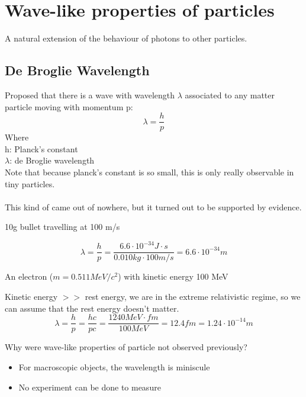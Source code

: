 \documentclass[class=article,crop=false]{standalone}
\begin{document}
\section{Wave-like properties of particles}
A natural extension of the behaviour of photons to other particles.

\subsection{De Broglie Wavelength}
Proposed that there is a wave with wavelength $\lambda$ associated to any matter particle moving with momentum p:
$$ \lambda = \frac{h}{p} $$
Where\\
h: Planck's constant\\
$\lambda$: de Broglie wavelength\\

Note that because planck's constant is so small, this is only really observable in tiny particles.\\
\\
This kind of came out of nowhere, but it turned out to be supported by evidence.\\

\begin{question}[Example]
	10g bullet travelling at 100 m/s
	\begin{answer}
		$$\lambda = \frac{h}{p} = \frac{6.6 \cdot 10^{-34} J \cdot s}{0.010 kg \cdot 100 m/s} = 6.6 \cdot 10^{-34} m$$
	\end{answer}

	An electron ($m=0.511 MeV/c^2$) with kinetic energy 100 MeV
	\begin{answer}
		Kinetic energy $>>$ rest energy, we are in the extreme relativistic regime, so we can assume that the rest energy doesn't matter.\\
		$$ \lambda = \frac{h}{p} = \frac{hc}{pc} = \frac{1240 MeV \cdot fm}{100 MeV} = 12.4 fm = 1.24 \cdot 10^{-14} m $$
	\end{answer}
\end{question}

Why were wave-like properties of particle not observed previously? \\
\begin{itemize}
	\item For macroscopic objects, the wavelength is miniscule
	\item No experiment can be done to measure 
\end{itemize}
\end{document}
